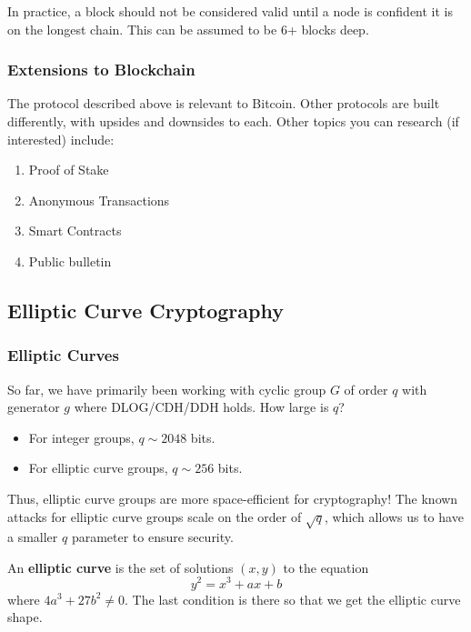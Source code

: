 In practice, a block should not be considered valid until a node is confident it is on the longest chain. This can be assumed to be 6+ blocks deep.


\subsubsection{Extensions to Blockchain}
The protocol described above is relevant to Bitcoin. Other protocols are built differently, with upsides and downsides to each. Other topics you can research (if interested) include:
\begin{enumerate}
    \item Proof of Stake
    \item Anonymous Transactions
    \item Smart Contracts
    \item Public bulletin
\end{enumerate}

\subsection{Elliptic Curve Cryptography}

\subsubsection{Elliptic Curves}

So far, we have primarily been working with cyclic group $G$ of order $q$ with generator $g$ where DLOG/CDH/DDH holds. How large is $q$?

\begin{itemize}
    \item For integer groups, $q \sim 2048$ bits.
    \item For elliptic curve groups, $q \sim 256$ bits.
\end{itemize}

Thus, elliptic curve groups are more space-efficient for cryptography! The known attacks for elliptic curve groups scale on the order of $\sqrt{q}$, which allows us to have a smaller $q$ parameter to ensure security.

\begin{definition}
    An \textbf{elliptic curve} is the set of solutions $(x,y)$ to the equation
    $$y^2 = x^3 + ax + b$$
    where $4a^3 + 27b^2 \neq 0$. The last condition is there so that we get the elliptic curve shape.
\end{definition}

